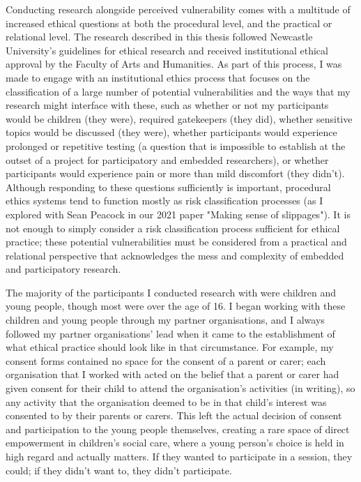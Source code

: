 Conducting research alongside perceived vulnerability comes with a multitude of increased ethical questions at both the procedural level, and the practical or relational level. The research described in this thesis followed Newcastle University’s guidelines for ethical research and received institutional ethical approval by the Faculty of Arts and Humanities. As part of this process, I was made to engage with an institutional ethics process that focuses on the classification of a large number of potential vulnerabilities and the ways that my research might interface with these, such as whether or not my participants would be children (they were), required gatekeepers (they did), whether sensitive topics would be discussed (they were), whether participants would experience prolonged or repetitive testing (a question that is impossible to establish at the outset of a project for participatory and embedded researchers), or whether participants would experience pain or more than mild discomfort (they didn’t). Although responding to these questions sufficiently is important, procedural ethics systems tend to function mostly as risk classification processes  (as I explored with Sean Peacock in our 2021 paper "Making sense of slippages"\citeyearpar{cutting_making_2021}). It is not enough to simply consider a risk classification process sufficient for ethical practice; these potential vulnerabilities must be considered from a practical and relational perspective that acknowledges the mess and complexity of embedded and participatory research.

The majority of the participants I conducted research with were children and young people, though most were over the age of 16. I began working with these children and young people through my partner organisations, and I always followed my partner organisations’ lead when it came to the establishment of what ethical practice should look like in that circumstance. For example, my consent forms contained no space for the consent of a parent or carer; each organisation that I worked with acted on the belief that a parent or carer had given consent for their child to attend the organisation’s activities (in writing), so any activity that the organisation deemed to be in that child’s interest was consented to by their parents or carers. This left the actual decision of consent and participation to the young people themselves, creating a rare space of direct empowerment in children’s social care, where a young person's choice is held in high regard and actually matters. If they wanted to participate in a session, they could; if they didn't want to, they didn't participate. 

